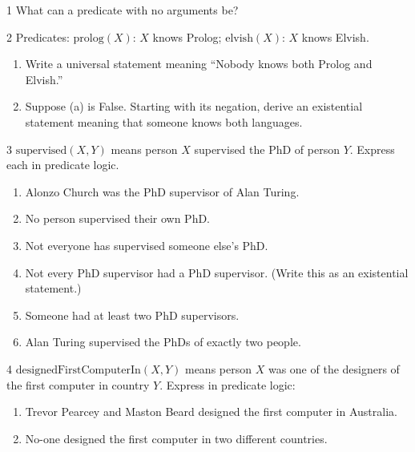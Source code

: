 
\begin{exercise}{1}
    What can a predicate with no arguments be?
\end{exercise}

\begin{exercise}{2}
    Predicates: $\mathrm{prolog}(X)$: $X$ knows Prolog;
    $\mathrm{elvish}(X)$: $X$ knows Elvish.
    \begin{enumerate}[label=(\alph*)]
        \item Write a universal statement meaning ``Nobody knows both Prolog and
              Elvish.''
        \item Suppose (a) is False. Starting with its negation, derive an
              existential statement meaning that someone knows both languages.
    \end{enumerate}
\end{exercise}

\begin{exercise}{3}
    $\mathrm{supervised}(X,Y)$ means person $X$ supervised the PhD of person $Y$.
    Express each in predicate logic.
    \begin{enumerate}[label=(\alph*)]
        \item Alonzo Church was the PhD supervisor of Alan Turing.
        \item No person supervised their own PhD.
        \item Not everyone has supervised someone else's PhD.
        \item Not every PhD supervisor had a PhD supervisor. (Write this as an
              existential statement.)
        \item Someone had at least two PhD supervisors.
        \item Alan Turing supervised the PhDs of exactly two people.
    \end{enumerate}
\end{exercise}

\begin{exercise}{4}
    $\mathrm{designedFirstComputerIn}(X,Y)$ means person $X$ was one of the
    designers of the first computer in country $Y$. Express in predicate logic:
    \begin{enumerate}[label=(\alph*)]
        \item Trevor Pearcey and Maston Beard designed the first computer in
              Australia.
        \item No-one designed the first computer in two different countries.
    \end{enumerate}
\end{exercise}

